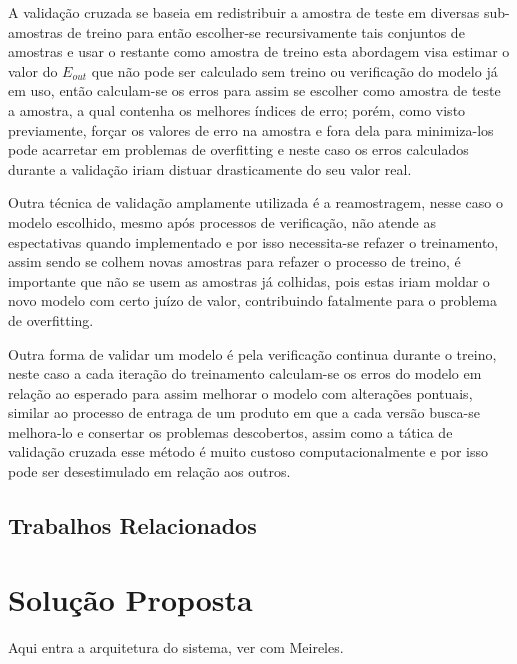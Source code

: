 \documentclass[pfc]{imetex}
\begin{document}
    A validação cruzada se baseia em redistribuir a amostra de teste em diversas sub-amostras de treino para então escolher-se recursivamente tais conjuntos de amostras e usar o restante como amostra de treino esta abordagem visa estimar o valor do $E_{out}$ que não pode ser calculado sem treino ou verificação do modelo já em uso, então calculam-se os erros para assim se escolher como amostra de teste a amostra, a qual contenha os melhores índices de erro; porém, como visto previamente, forçar os valores de erro na amostra e fora dela para minimiza-los pode acarretar em problemas de overfitting e neste caso os erros calculados durante a validação iriam distuar drasticamente do seu valor real.

    Outra técnica de validação amplamente utilizada é a reamostragem, nesse caso o modelo escolhido, mesmo após processos de verificação, não atende as espectativas quando implementado e por isso necessita-se refazer o treinamento, assim sendo se colhem novas amostras para refazer o processo de treino, é importante que não se usem as amostras já colhidas, pois estas iriam moldar o novo modelo com certo juízo de valor, contribuindo fatalmente para o problema de overfitting.

    Outra forma de validar um modelo é pela verificação continua durante o treino, neste caso a cada iteração do treinamento calculam-se os erros  do modelo em relação ao esperado para assim melhorar o modelo com alterações pontuais, similar ao processo de entraga de um produto em que a cada versão busca-se melhora-lo e consertar os problemas descobertos, assim como a tática de validação cruzada esse método é muito custoso computacionalmente e por isso pode ser desestimulado em relação aos outros.
    
\label{fundamentaca}


\section{Trabalhos Relacionados}

\label{relacionados}


\chapter{Solução Proposta}
\label{solucao}
Aqui entra a arquitetura do sistema, ver com Meireles.\
\begin{center}
    \noindent{}
\end{center}
\end{document}

